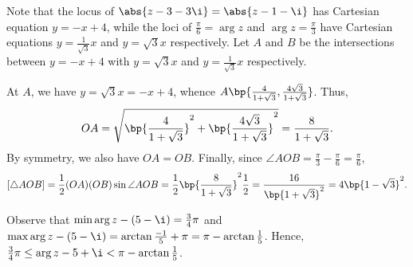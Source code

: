\begin{solution}
\begin{ppart}
\begin{center}
            \end{center}
    \end{ppart}
    \begin{ppart}
        Note that the locus of $\abs{z - 3 - 3\i} = \abs{z - 1 - \i}$ has Cartesian equation $y = -x + 4$, while the loci of $\frac\pi6 = \arg{z}$ and $\arg{z} = \frac\pi3$ have Cartesian equations $y = \frac1{\sqrt3} x$ and $y = \sqrt3 x$ respectively. Let $A$ and $B$ be the intersections between $y = -x + 4$ with $y = \sqrt3 x$ and $y = \frac1{\sqrt3}x$ respectively.

        At $A$, we have $y = \sqrt3 x = -x + 4$, whence $A\bp{\frac4{1 + \sqrt3}, \frac{4\sqrt3}{1 + \sqrt3}}$. Thus, \[OA = \sqrt{\bp{\frac{4}{1 + \sqrt3}}^2 + \bp{\frac{4\sqrt3}{1 + \sqrt3}}^2} = \frac{8}{1 + \sqrt3}.\] By symmetry, we also have $OA = OB$. Finally, since $\angle AOB = \frac\pi3 - \frac\pi6 = \frac\pi6$, \[[\triangle AOB] = \frac12 (OA)(OB)\sin \angle AOB = \frac12 \bp{\frac8{1 + \sqrt3}}^2 \frac12 = \frac{16}{\bp{1 + \sqrt3}^2} = 4\bp{1 - \sqrt3}^2.\]
    \end{ppart}
    \begin{ppart}
        Observe that $\min \arg{z - (5 - \i)} = \frac34 \pi$ and $\max \arg{z - (5 -\i)} = \arctan \frac{-1}5 + \pi = \pi -\arctan \frac15 $. Hence, $\frac34 \pi \leq \arg{z - 5 + \i} < \pi-\arctan \frac15$.
    \end{ppart}
\end{solution}

